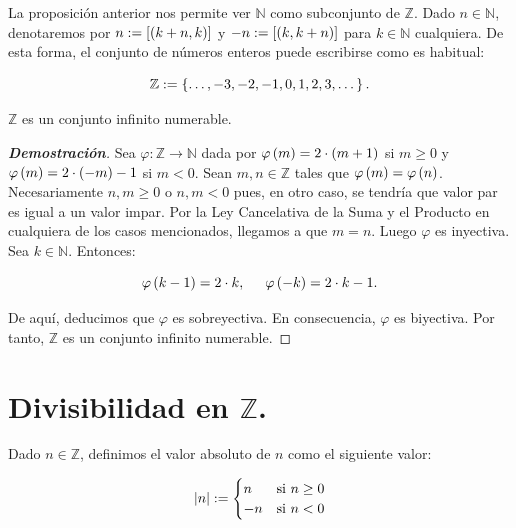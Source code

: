 La proposición anterior nos permite ver $\mathbb{N}$ como subconjunto de $\mathbb{Z}$. Dado $n\in\mathbb{N}$, denotaremos por $n:=\left[\left(k+n,k\right)\right]$ y $-n:=\left[\left(k,k+n\right)\right]$ para $k\in\mathbb{N}$ cualquiera. De esta forma, el conjunto de números enteros puede escribirse como es habitual:

\begin{equation}
  \mathbb{Z}:=\left\{\dots,-3,-2,-1,0,1,2,3,\dots\right\}.
\end{equation}

\begin{proposition}
  \rm $\mathbb{Z}$ es un conjunto infinito numerable.
  \begin{proof}[\rm\textbf{Demostración}]
    Sea $\varphi:\mathbb{Z}\rightarrow\mathbb{N}$ dada por $\varphi\left(m\right)=2\cdot\left(m+1\right)$ si $m\geq 0$ y $\varphi\left(m\right)=2\cdot \left(-m\right)-1$ si $m<0$. Sean $m,n\in\mathbb{Z}$ tales que $\varphi\left(m\right)=\varphi\left(n\right)$. Necesariamente $n,m\geq 0$ o $n,m<0$ pues, en otro caso, se tendría que valor par es igual a un valor impar. Por la Ley Cancelativa de la Suma y el Producto en cualquiera de los casos mencionados, llegamos a que $m=n$. Luego $\varphi$ es inyectiva. Sea $k\in\mathbb{N}$. Entonces:

    \begin{equation}
      \varphi\left(k-1\right)=2\cdot k,\hspace{0.5cm}\varphi\left(-k\right)=2\cdot k-1.
    \end{equation}

    De aquí, deducimos que $\varphi$ es sobreyectiva. En consecuencia, $\varphi$ es biyectiva. Por tanto, $\mathbb{Z}$ es un conjunto infinito numerable.
  \end{proof}
\end{proposition}
\section{Divisibilidad en \texorpdfstring{$\mathbb{Z}$}{Z}.}

Dado $n\in\mathbb{Z}$, definimos el valor absoluto de $n$ como el siguiente valor:

\begin{equation}
  \left|n\right|:=\begin{cases}
    n & \text{si $n\geq 0$}\\
    -n & \text{si $n<0$}
  \end{cases}
\end{equation}


